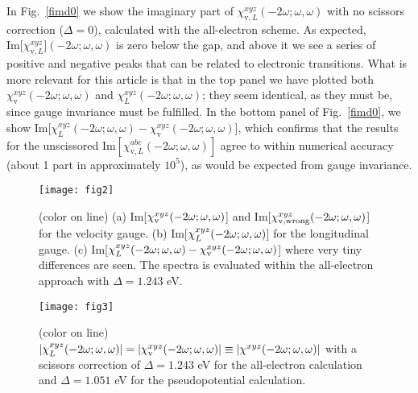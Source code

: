 \documentclass[floatfix,prb,aps,superscriptaddress,11pt]{revtex4}
\begin{document}
In Fig.~\ref{fimd0} we show the imaginary part of $\chi _{\mathrm{v}
,L}^{xyz}(-2\omega;\omega,\omega) $ with no scissors correction ($\Delta=0$), calculated with the
all-electron scheme.\cite{nota1} As expected, $\mbox{Im}\lbrack \chi _{
\mathrm{v},L}^{xyz}](-2\omega;\omega,\omega)$ is zero below the gap, and above it we see a series of
positive and negative peaks that can be related to electronic transitions.
What is more relevant for this article is that in the top panel we have
plotted both $\chi _{\mathrm{v}}^{xyz}(-2\omega;\omega,\omega)$ and $\chi _{L}^{xyz}(-2\omega;\omega,\omega)$; they seem
identical, as they must be, since gauge invariance must be fulfilled. In the
bottom panel of Fig.~\ref{fimd0}, we show $\mbox{Im}\lbrack \chi
_{L}^{xyz}(-2\omega;\omega,\omega)-\chi _{\mathrm{v}}^{xyz}(-2\omega;\omega,\omega)]$,
which confirms that the results for the unscissored 
$\mathrm{Im}[\chi _{\mathrm{v},L}^{abc}(-2\omega;\omega,\omega)]$ 
agree to within numerical accuracy (about 1 part in approximately
$10^5$),
as would be expected from gauge invariance.

\begin{figure}[t]
\texttt{[image: fig2]}
\caption{(color on line) 
(a) Im[$\protect\chi^{xyz}_{\mathrm{v}}(-2\omega;\omega,\omega)$] and Im[$\protect\chi
^{xyz}_{\mathrm{v,wrong}}(-2\omega;\omega,\omega)$] for the velocity
gauge.
(b)
Im[$\protect\chi^{xyz}_L (-2\omega;\omega,\omega)$] for the
longitudinal gauge.
(c)
Im[$\protect\chi
^{xyz}_{L}(-2\omega;\omega,\omega)-\protect\chi^{xyz}_{\mathrm{v}}(-2\omega;\omega,\omega)$] where very tiny
differences are seen. The spectra is evaluated within the all-electron
approach with $\Delta=1.243$ eV.}
\label{fimd}
\end{figure}

\begin{figure}[t]
\texttt{[image: fig3]}
\caption{(color on line)
$|\protect\chi^{xyz}_{L}(-2\omega;\omega,\omega)|=|\protect\chi^{xyz}_{\mathrm{v}}(-2\omega;\omega,\omega)|
\equiv|\protect\chi^{xyz}(-2\omega;\omega,\omega)|$ with a scissors correction of $\Delta=1.243$ eV for the
all-electron calculation and $\Delta=1.051$ eV for the pseudopotential
calculation.}
\label{flvsv}
\end{figure}
\end{document}
